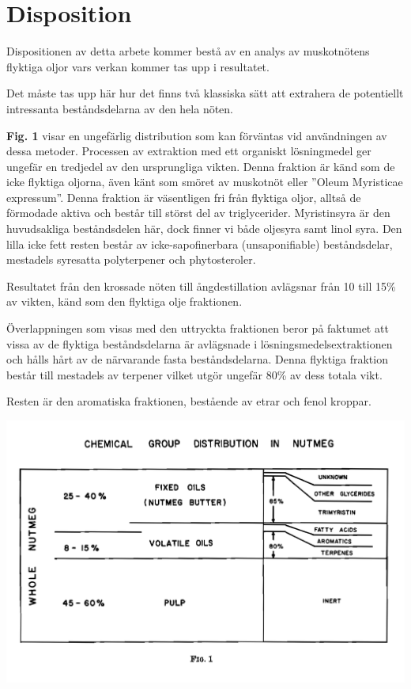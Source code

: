 \documentclass[a4paper,margin=3.25cm]{article}
\begin{document}
\pagebreak

\section{Disposition}

Dispositionen av detta arbete kommer bestå av en analys av muskotnötens flyktiga oljor
vars verkan kommer tas upp i resultatet.

Det måste tas upp här hur det finns två klassiska sätt att extrahera de potentiellt intressanta beståndsdelarna av den hela nöten.

\textbf{Fig. 1} \cite{shulgin1967chemistry} visar en ungefärlig distribution som kan förväntas vid användningen av dessa metoder. Processen av extraktion med ett organiskt lösningmedel ger ungefär en tredjedel av den ursprungliga vikten. Denna fraktion är känd som de icke flyktiga oljorna, även känt som smöret av muskotnöt eller ''Oleum Myristicae expressum''. Denna fraktion är väsentligen fri från flyktiga oljor, alltså de förmodade aktiva och består till störst del av triglycerider. Myristinsyra är den huvudsakliga beståndsdelen här, dock finner vi både oljesyra samt linol syra. Den lilla icke fett resten består av icke-sapofinerbara (unsaponifiable) beståndsdelar, mestadels syresatta polyterpener och phytosteroler. \cite{shulgin1967chemistry}

Resultatet från den krossade nöten till ångdestillation avlägsnar från 10 till 15\% av vikten, känd som den flyktiga olje fraktionen.

Överlappningen som visas med den uttryckta fraktionen beror på faktumet att vissa av de flyktiga beståndsdelarna är avlägsnade i lösningsmedelsextraktionen och hålls hårt av de närvarande fasta beståndsdelarna.
Denna flyktiga fraktion består till mestadels av terpener vilket utgör ungefär 80\% av dess totala vikt.

Resten är den aromatiska fraktionen, bestående av etrar och fenol kroppar.\cite{shulgin1967chemistry}


\includegraphics[scale=0.103]{Figure1}
\end{document}

